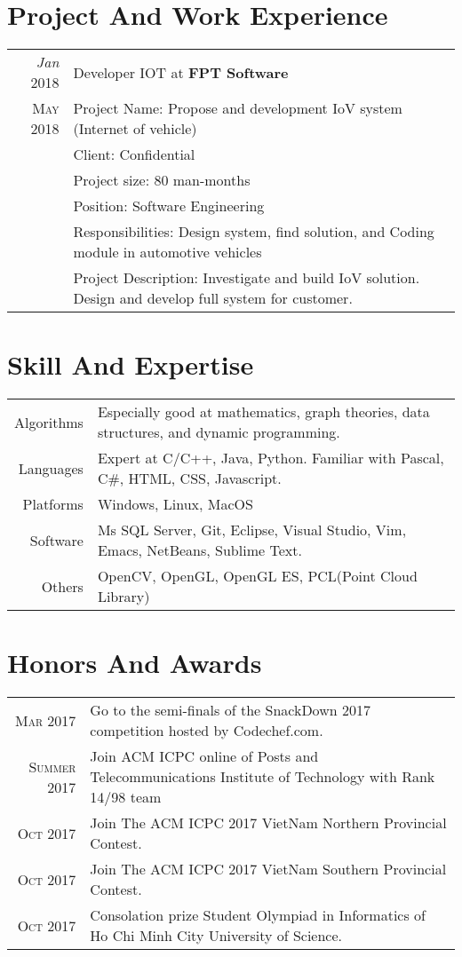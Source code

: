 \documentclass[a4paper,10pt]{article}
\begin{document}
\section{Project And Work Experience}
\begin{tabular}{r|p{14cm}}
 \emph{Jan} 2018 & Developer IOT at \textbf{FPT Software} \\\textsc{May 2018}& Project Name: Propose and development IoV system (Internet of vehicle) \\& Client: Confidential\\& Project size: 80 man-months\\& Position: Software Engineering\\& Responsibilities: Design system, find solution, and Coding module in automotive vehicles\\& Project Description: Investigate and build IoV solution. Design and develop full system for customer.\multicolumn{2}{c}{} \\
\end{tabular}

\section{Skill And Expertise}
\begin{tabular}{rl}
 \textsc{}Algorithms & Especially good at mathematics, graph theories, data structures, and dynamic programming.\\
\textsc{}Languages & Expert at C/C++, Java, Python. Familiar with Pascal, C\#, HTML, CSS, Javascript.\\
\textsc{}Platforms & Windows, Linux, MacOS\\
\textsc{} Software & Ms SQL Server, Git, Eclipse, Visual Studio, Vim, Emacs, NetBeans, Sublime Text.\\
\textsc{} Others & OpenCV, OpenGL, OpenGL ES, PCL(Point Cloud Library)\\
\end{tabular}

\section{Honors And Awards}
\begin{tabular}{rl}
 \textsc{Mar} 2017 & Go to the semi-finals of the SnackDown 2017 competition hosted by Codechef.com.\\
\textsc{Summer} 2017 & Join ACM ICPC online of Posts and Telecommunications Institute of Technology with Rank 14/98 team\\
\textsc{Oct} 2017 & Join The ACM ICPC 2017 VietNam Northern Provincial Contest.\\
\textsc{Oct} 2017 & Join The ACM ICPC 2017 VietNam Southern Provincial Contest.\\
\textsc{Oct} 2017 & Consolation prize Student Olympiad in Informatics of Ho Chi Minh City University of Science.\\

\end{tabular}
\end{document}
